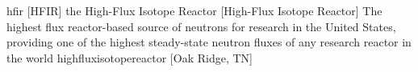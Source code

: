 \newglsXinstitution%
{hfir}%
[HFIR]%
{the High{\--}Flux Isotope Reactor}%
[High{\--}Flux Isotope Reactor]%
{The highest flux reactor-based source of neutrons for research in the United States, providing one of the highest steady-state neutron fluxes of any research reactor in the world \cite{website:High_Flux_Isotope_Reactor}}%
{highfluxisotopereactor}%
[Oak Ridge, TN]%